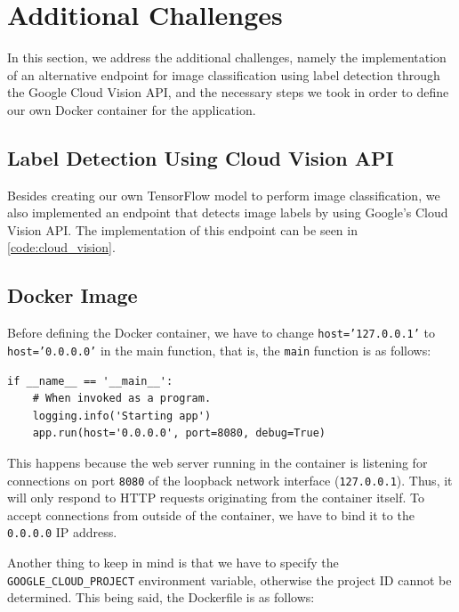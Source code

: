 \documentclass[a4paper, 11pt]{article}
\begin{document}
\pagebreak

\section{Additional Challenges} \label{sec:aditional-challenges}

In this section, we address the additional challenges, namely the implementation of an alternative 
endpoint for image classification using label detection through the Google Cloud Vision API, and 
the necessary steps we took in order to define our own Docker container for the application.

\subsection{Label Detection Using Cloud Vision API}

Besides creating our own TensorFlow model to perform image classification, we also implemented an 
endpoint that detects image labels by using Google's Cloud Vision API. The implementation of this 
endpoint can be seen in \cref{code:cloud_vision}.

\subsection{Docker Image}

Before defining the Docker container, we have to change \texttt{host='127.0.0.1'} to 
\texttt{host='0.0.0.0'} in the main function, that is, the \texttt{main} function is as follows:

\begin{verbatim}
if __name__ == '__main__':
    # When invoked as a program.
    logging.info('Starting app')
    app.run(host='0.0.0.0', port=8080, debug=True)
\end{verbatim}

This happens because the web server running in the container is listening for connections on port 
\texttt{8080} of the loopback network interface (\texttt{127.0.0.1}). Thus, it will only respond to 
HTTP requests originating from the container itself. To accept connections from outside of the 
container, we have to bind it to the \texttt{0.0.0.0} IP address.

Another thing to keep in mind is that we have to specify the \texttt{GOOGLE\_CLOUD\_PROJECT} 
environment variable, otherwise the project ID cannot be determined. This being said, the 
Dockerfile is as follows:

\vspace{\baselineskip}
\end{document}
